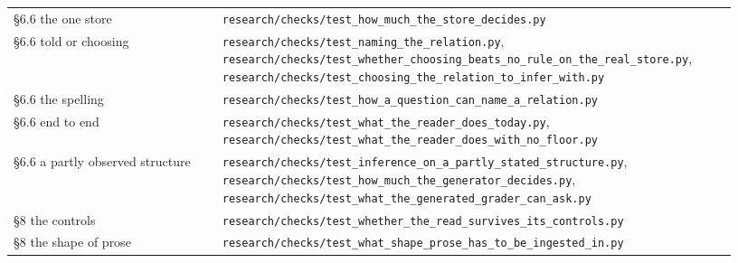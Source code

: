 \documentclass[10pt,letterpaper,twocolumn]{article}
\begin{document}
\begin{center}
{\begin{xtabular}{L{0.276\linewidth}L{0.655\linewidth}}
§6.6 the one store & \texttt{research/\allowbreak{}checks/\allowbreak{}test\_\allowbreak{}how\_\allowbreak{}much\_\allowbreak{}the\_\allowbreak{}store\_\allowbreak{}decides.\allowbreak{}py} \\
§6.6 told or choosing & \texttt{research/\allowbreak{}checks/\allowbreak{}test\_\allowbreak{}naming\_\allowbreak{}the\_\allowbreak{}relation.\allowbreak{}py},
\texttt{research/\allowbreak{}checks/\allowbreak{}test\_\allowbreak{}whether\_\allowbreak{}choosing\_\allowbreak{}beats\_\allowbreak{}no\_\allowbreak{}rule\_\allowbreak{}on\_\allowbreak{}the\_\allowbreak{}real\_\allowbreak{}store.\allowbreak{}py},
\texttt{research/\allowbreak{}checks/\allowbreak{}test\_\allowbreak{}choosing\_\allowbreak{}the\_\allowbreak{}relation\_\allowbreak{}to\_\allowbreak{}infer\_\allowbreak{}with.\allowbreak{}py} \\
§6.6 the spelling & \texttt{research/\allowbreak{}checks/\allowbreak{}test\_\allowbreak{}how\_\allowbreak{}a\_\allowbreak{}question\_\allowbreak{}can\_\allowbreak{}name\_\allowbreak{}a\_\allowbreak{}relation.\allowbreak{}py} \\
§6.6 end to end & \texttt{research/\allowbreak{}checks/\allowbreak{}test\_\allowbreak{}what\_\allowbreak{}the\_\allowbreak{}reader\_\allowbreak{}does\_\allowbreak{}today.\allowbreak{}py},
\texttt{research/\allowbreak{}checks/\allowbreak{}test\_\allowbreak{}what\_\allowbreak{}the\_\allowbreak{}reader\_\allowbreak{}does\_\allowbreak{}with\_\allowbreak{}no\_\allowbreak{}floor.\allowbreak{}py} \\
§6.6 a partly observed structure & \texttt{research/\allowbreak{}checks/\allowbreak{}test\_\allowbreak{}inference\_\allowbreak{}on\_\allowbreak{}a\_\allowbreak{}partly\_\allowbreak{}stated\_\allowbreak{}structure.\allowbreak{}py},
\texttt{research/\allowbreak{}checks/\allowbreak{}test\_\allowbreak{}how\_\allowbreak{}much\_\allowbreak{}the\_\allowbreak{}generator\_\allowbreak{}decides.\allowbreak{}py},
\texttt{research/\allowbreak{}checks/\allowbreak{}test\_\allowbreak{}what\_\allowbreak{}the\_\allowbreak{}generated\_\allowbreak{}grader\_\allowbreak{}can\_\allowbreak{}ask.\allowbreak{}py} \\
§8 the controls & \texttt{research/\allowbreak{}checks/\allowbreak{}test\_\allowbreak{}whether\_\allowbreak{}the\_\allowbreak{}read\_\allowbreak{}survives\_\allowbreak{}its\_\allowbreak{}controls.\allowbreak{}py} \\
§8 the shape of prose & \texttt{research/\allowbreak{}checks/\allowbreak{}test\_\allowbreak{}what\_\allowbreak{}shape\_\allowbreak{}prose\_\allowbreak{}has\_\allowbreak{}to\_\allowbreak{}be\_\allowbreak{}ingested\_\allowbreak{}in.\allowbreak{}py} \\

\end{xtabular}}
\end{center}
\end{document}
